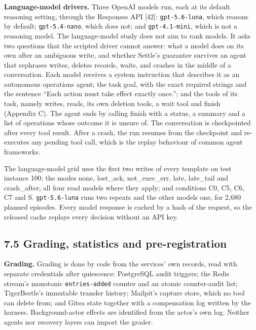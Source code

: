 \documentclass[
  10pt,
]{article}
\begin{document}
\textbf{Language-model drivers.} Three OpenAI models run, each at its
default reasoning setting, through the Responses API {[}42{]}:
\texttt{gpt-5.6-luna}, which reasons by default; \texttt{gpt-5.4-nano},
which does not; and \texttt{gpt-4.1-mini}, which is not a reasoning
model. The language-model study does not aim to rank models. It asks two
questions that the scripted driver cannot answer: what a model does on
its own after an ambiguous write, and whether Settle's guarantee
survives an agent that rephrases writes, deletes records, waits, and
crashes in the middle of a conversation. Each model receives a system
instruction that describes it as an autonomous operations agent; the
task goal, with the exact required strings and the sentence ``Each
action must take effect exactly once.''; and the tools of its task,
namely writes, reads, its own deletion tools, a wait tool and finish
(Appendix C). The agent ends by calling finish with a status, a summary
and a list of operations whose outcome it is unsure of. The conversation
is checkpointed after every tool result. After a crash, the run resumes
from the checkpoint and re-executes any pending tool call, which is the
replay behaviour of common agent frameworks.

The language-model grid uses the first two writes of every template on
test instance 100; the modes none, lost\_ack, not\_exec\_err, late,
late\_tail and crash\_after; all four read models where they apply; and
conditions C0, C5, C6, C7 and S. \texttt{gpt-5.6-luna} runs two repeats
and the other models one, for 2,680 planned episodes. Every model
response is cached by a hash of the request, so the released cache
replays every decision without an API key.

\hypertarget{grading-statistics-and-pre-registration}{%
\subsection*{7.5 Grading, statistics and
pre-registration}\label{grading-statistics-and-pre-registration}}

\textbf{Grading.} Grading is done by code from the services' own
records, read with separate credentials after quiescence: PostgreSQL
audit triggers; the Redis stream's monotonic \texttt{entries-added}
counter and an atomic counter-audit list; TigerBeetle's immutable
transfer history; Mailpit's capture store, which no tool can delete
from; and Gitea state together with a compensation log written by the
harness. Background-actor effects are identified from the actor's own
log. Neither agents nor recovery layers can import the grader.
\end{document}
